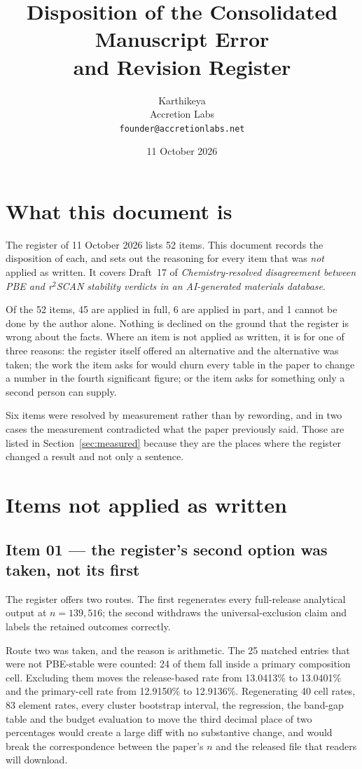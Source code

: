 \documentclass[11pt]{article}
\title{\textbf{Disposition of the Consolidated Manuscript Error\\and Revision Register}}
\author{Karthikeya \\ \small Accretion Labs \\ \small \texttt{founder@accretionlabs.net}}
\date{11 October 2026}
\begin{document}
\maketitle

\section*{What this document is}

The register of 11 October 2026 lists 52 items. This document records the disposition of
each, and sets out the reasoning for every item that was \emph{not} applied as written. It
covers Draft~17 of \emph{Chemistry-resolved disagreement between PBE and r$^2$SCAN
stability verdicts in an AI-generated materials database}.

Of the 52 items, 45 are applied in full, 6 are applied in part, and 1 cannot be done by the
author alone. Nothing is declined on the ground that the register is wrong about the facts.
Where an item is not applied as written, it is for one of three reasons: the register itself
offered an alternative and the alternative was taken; the work the item asks for would churn
every table in the paper to change a number in the fourth significant figure; or the item
asks for something only a second person can supply.

Six items were resolved by measurement rather than by rewording, and in two cases the
measurement contradicted what the paper previously said. Those are listed in
Section~\ref{sec:measured} because they are the places where the register changed a result
and not only a sentence.

\section{Items not applied as written}

\subsection*{Item 01 --- the register's second option was taken, not its first}

The register offers two routes. The first regenerates every full-release analytical output
at $n = 139{,}516$; the second withdraws the universal-exclusion claim and labels the
retained outcomes correctly.

Route two was taken, and the reason is arithmetic. The 25 matched entries that were not
PBE-stable were counted: 24 of them fall inside a primary composition cell. Excluding them
moves the release-based rate from 13.0413\% to 13.0401\% and the primary-cell rate from
12.9150\% to 12.9136\%. Regenerating 40 cell rates, 83 element rates, every cluster
bootstrap interval, the regression, the band-gap table and the budget evaluation to move the
third decimal place of two percentages would create a large diff with no substantive change,
and would break the correspondence between the paper's $n$ and the released file that
readers will download.
\end{document}
